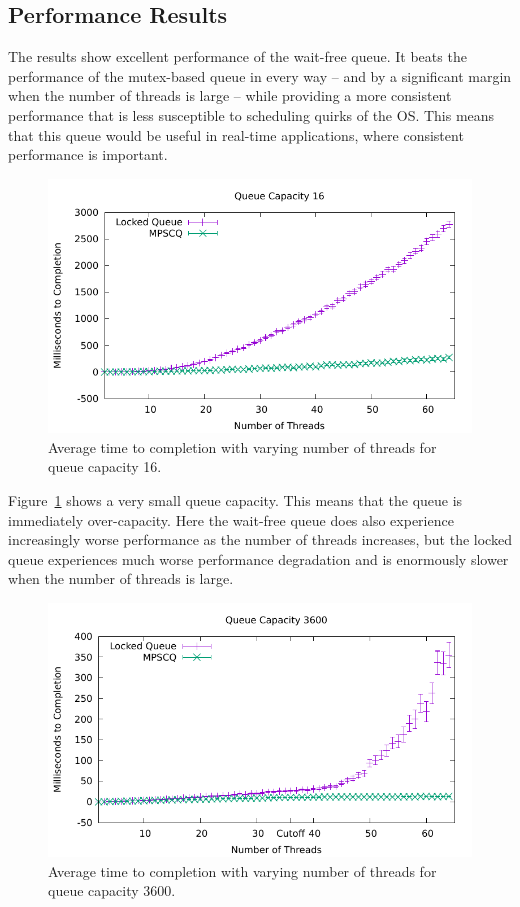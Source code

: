 \documentclass[12pt]{article}
\begin{document}
\subsection{Performance Results}
The results show excellent performance of the wait-free queue. It beats the performance of the mutex-based
queue in every way -- and by a significant margin when the number of threads is large -- while providing
a more consistent performance that is less susceptible to scheduling quirks of the OS. This means that this
queue would be useful in real-time applications, where consistent performance is important.

\begin{figure}[h]
	\centering
	\includegraphics[width=170mm]{data_16.pdf}
	\caption{Average time to completion with varying number of threads for queue capacity 16.}
	\label{fig-16}
\end{figure}

Figure~\ref{fig-16} shows a very small queue capacity. This means that the queue
is immediately over-capacity. Here the wait-free queue does also experience
increasingly worse performance as the number of threads increases,
but the locked queue experiences much worse performance degradation and is
enormously slower when the number of threads is large.

\begin{figure}[h]
	\centering 
	\includegraphics[width=170mm]{data_3600.pdf}
	\caption{Average time to completion with varying number of threads for queue capacity 3600.}
	\label{fig-3600}
\end{figure}
\end{document}
